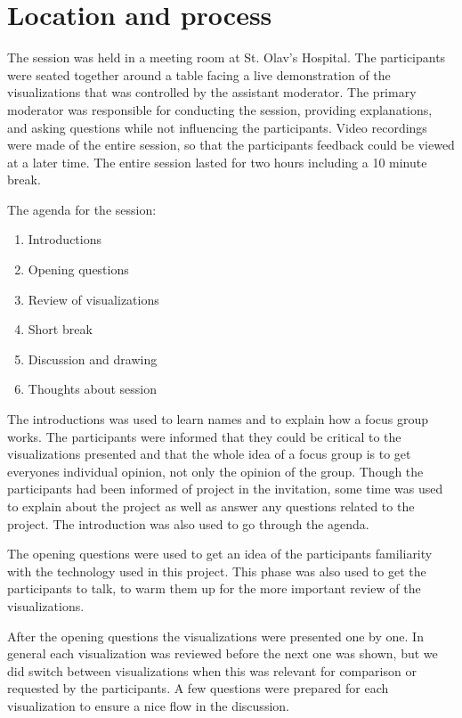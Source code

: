 \section{Location and process}
The session was held in a meeting room at St. Olav's Hospital. The participants were seated together around a table facing a live demonstration of the visualizations that was controlled by the assistant moderator. The primary moderator was responsible for conducting the session, providing explanations, and asking questions while not influencing the participants. Video recordings were made of the entire session, so that the participants feedback could be viewed at a later time. The entire session lasted for two hours including a 10 minute break.

The agenda for the session:
\vspace{-8mm}
\begin{enumerate}[itemsep=0cm, parsep=0cm]
  \item Introductions
  \item Opening questions
  \item Review of visualizations
  \item Short break
  \item Discussion and drawing
  \item Thoughts about session
\end{enumerate}

The introductions was used to learn names and to explain how a focus group works. The participants were informed that they could be critical to the visualizations presented and that the whole idea of a focus group is to get everyones individual opinion, not only the opinion of the group. Though the participants had been informed of project in the invitation, some time was used to explain about the project as well as answer any questions related to the project. The introduction was also used to go through the agenda.

The opening questions were used to get an idea of the participants familiarity with the technology used in this project. This phase was also used to get the participants to talk, to warm them up for the more important review of the visualizations.

After the opening questions the visualizations were presented one by one. In general each visualization was reviewed before the next one was shown, but we did switch between visualizations when this was relevant for comparison or requested by the participants. A few questions were prepared for each visualization to ensure a nice flow in the discussion.

